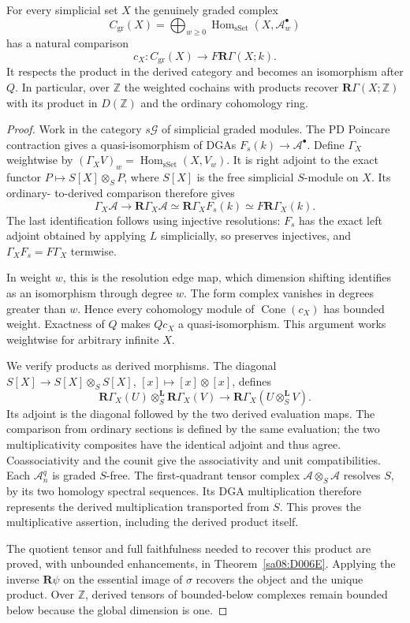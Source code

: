 \begin{theorem}
\label{sa08:D006}
For every simplicial set $X$ the genuinely graded complex
\[
 C_{\mathrm{gr}}(X)=\bigoplus_{w\geq0}
       \operatorname{Hom}_{\mathrm{sSet}}(X,\mathcal A_w^\bullet)
\]
has a natural comparison
\[
 c_X:C_{\mathrm{gr}}(X)\longrightarrow F\mathbf R\Gamma(X;k).
\]
It respects the product in the derived category and becomes an
isomorphism after $Q$. In particular, over $\mathbb Z$ the weighted
cochains with products recover $\mathbf R\Gamma(X;\mathbb Z)$ with
its product in $D(\mathbb Z)$ and the ordinary cohomology ring.
\end{theorem}
\begin{proof}
Work in the category $s\mathcal G$ of simplicial graded modules.
The PD Poincare contraction gives a quasi-isomorphism of DGAs
$F_s(k)\to\mathcal A^\bullet$. Define $\Gamma_X$ weightwise by
$(\Gamma_XV)_w=\operatorname{Hom}_{\mathrm{sSet}}(X,V_w)$. It is
right adjoint to the exact functor $P\mapsto S[X]\otimes_SP$,
where $S[X]$ is the free simplicial $S$-module on $X$. Its ordinary-
to-derived comparison therefore gives
\[
 \Gamma_X\mathcal A\longrightarrow\mathbf R\Gamma_X\mathcal A
 \simeq\mathbf R\Gamma_XF_s(k)
 \simeq F\mathbf R\Gamma_X(k).
\]
The last identification follows using injective resolutions: $F_s$
has the exact left adjoint obtained by applying $L$ simplicially,
so preserves injectives, and $\Gamma_XF_s=F\Gamma_X$ termwise.

In weight $w$, this is the resolution edge map, which dimension
shifting identifies as an isomorphism through degree $w$.
The form complex vanishes in degrees greater than $w$. Hence every
cohomology module of $\operatorname{Cone}(c_X)$ has bounded weight.
Exactness of $Q$ makes $Qc_X$ a quasi-isomorphism. This argument
works weightwise for arbitrary infinite $X$.

We verify products as derived morphisms. The diagonal
$S[X]\to S[X]\otimes_SS[X]$, $[x]\mapsto[x]\otimes[x]$, defines
\[
 \mathbf R\Gamma_X(U)\otimes_S^{\mathbf L}\mathbf R\Gamma_X(V)
 \longrightarrow\mathbf R\Gamma_X(U\otimes_S^{\mathbf L}V).
\]
Its adjoint is the diagonal followed by the two derived evaluation
maps. The comparison from ordinary sections is defined by the same
evaluation; the two multiplicativity composites have the identical
adjoint and thus agree. Coassociativity and the counit give the
associativity and unit compatibilities. Each $\mathcal A^q_n$ is
graded $S$-free. The first-quadrant tensor complex
$\mathcal A\otimes_S\mathcal A$ resolves $S$, by its two homology
spectral sequences. Its DGA multiplication therefore represents the
derived multiplication transported from $S$. This proves the
multiplicative assertion, including the derived product itself.

The quotient tensor and full faithfulness needed to recover this
product are proved, with unbounded enhancements, in
Theorem~\ref{sa08:D006E}. Applying the inverse $\mathbf R\psi$ on
the essential image of $\sigma$ recovers the object and the unique
product. Over $\mathbb Z$, derived tensors of bounded-below
complexes remain bounded below because the global dimension is one.
\end{proof}

